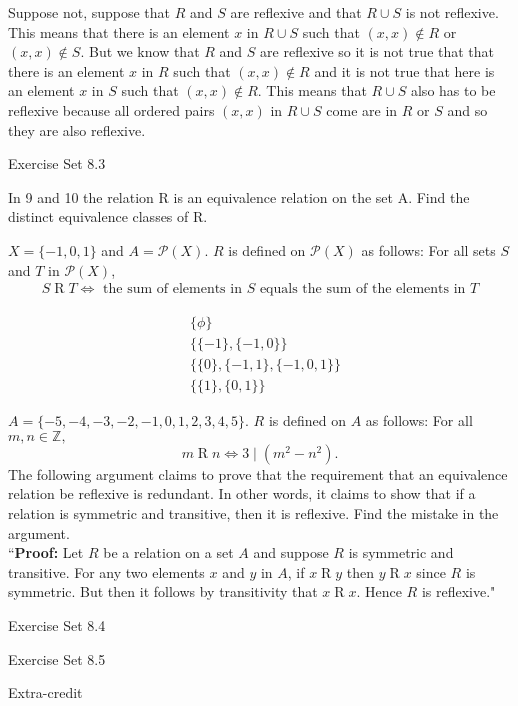 \documentclass[12pt,letterpaper, onecolumn]{exam}
\newcommand{\pnt}[1]{{\scriptstyle#1}}
\begin{document}
\begin{questions}
	\begin{solution}
	Suppose not, suppose that $R$ and $S$ are reflexive and that $R\cup S$ is not reflexive. This means that there is an element $x$ in $R\cup S$ such that $(x,x) \notin R$ or $(x,x)\notin S$. But we know that $R$ and $S$ are reflexive so it is not true that that there is an element $x$ in $R$ such that $(x,x)\notin R$ and it is not true that here is an element $x$ in $S$ such that $(x,x)\notin R$. This means that $R\cup S$ also has to be reflexive because all ordered pairs $(x,x)$ in $R\cup S$ come are in $R$ or $S$ and so they are also reflexive.
	\end{solution}
	\end{questions}
	\pagebreak
	\centerline{Exercise Set 8.3}
		   In 9 and 10 the relation R is an equivalence relation on the set A. Find the distinct equivalence classes of R.\\
	\begin{questions}
		\setcounter{question}{8}\question $X=\{-1,0,1\}$ and $A=\mathscr{P}(X)$. $R$ is defined on $\mathscr{P}(X)$ as follows: For all sets $\pnt{S}$ and $\pnt{T}$ in $\mathscr{P}(X)$,
		\begin{align*}
			\pnt{S}\mathrel{R}\pnt{T}\Leftrightarrow \text{ the sum of elements in $\pnt{S}$ equals the sum of the elements in $\pnt{T}$}
		\end{align*}
		\begin{solution}
			\begin{align*}
			&\{\phi\}\\
			&\{\{-1\},\{-1,0\}\}\\
			&\{\{0\},\{-1,1\},\{-1,0,1\}\}\\
			&\{\{1\},\{0,1\}\}
			\end{align*}
		\end{solution}
		\setcounter{question}{9}\question $A=\{-5,-4,-3,-2,-1,0,1,2,3,4,5\}.$ $R$ is defined on $A$ as follows: For all $m,n\in\mathbb{Z},$
		$$m\mathrel{R}n\Leftrightarrow 3\mid(m^2-n^2).$$
		\setcounter{question}{38}\question The following argument claims to prove that the requirement that an equivalence relation be reflexive is redundant. In other words, it claims to show that if a relation is symmetric and transitive, then it is reflexive. Find the mistake in the argument.\\
		``\textbf{Proof:} Let $R$ be a relation on a set $A$ and suppose $R$ is symmetric and transitive. For any two elements $x$ and $y$ in $A$, if $x\mathrel{R}y$ then $y\mathrel{R}x$ since $R$ is symmetric. But then it follows by transitivity that $x\mathrel{R}x$. Hence $R$ is reflexive."
	\end{questions}

	\centerline{Exercise Set 8.4}
	\begin{questions}
		
	\end{questions}
	\centerline{Exercise Set 8.5}
	\centerline{Extra-credit}
	
	
\end{document}
